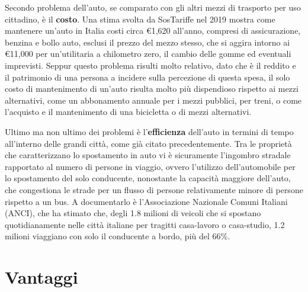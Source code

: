 Secondo problema dell'auto, se comparato con gli altri mezzi di trasporto per uso cittadino, è il \textbf{costo}. Una stima svolta da SosTariffe nel 2019 mostra come mantenere un'auto in Italia costi circa €1,620 all'anno, compresi di assicurazione, benzina e bollo auto, esclusi il prezzo del mezzo stesso, che si aggira intorno ai €11,000 per un'utilitaria a chilometro zero, il cambio delle gomme ed eventuali imprevisti\cite{sostariffe}. Seppur questo problema risulti molto relativo, dato che è il reddito e il patrimonio di una persona a incidere sulla percezione di questa spesa, il solo costo di mantenimento di un'auto risulta molto più dispendioso rispetto ai mezzi alternativi, come un abbonamento annuale per i mezzi pubblici, per treni, o come l'acquisto e il mantenimento di una bicicletta o di mezzi alternativi.

Ultimo ma non ultimo dei problemi è l'\textbf{efficienza} dell'auto in termini di tempo all'interno delle grandi città, come già citato precedentemente. Tra le proprietà che caratterizzano lo spostamento in auto vi è sicuramente l'ingombro stradale rapportato al numero di persone in viaggio, ovvero l'utilizzo dell'automobile per lo spostamento del solo conducente, nonostante la capacità maggiore dell'auto, che congestiona le strade per un flusso di persone relativamente minore di persone rispetto a un bus. A documentarlo è l'Associazione Nazionale Comuni Italiani (ANCI), che ha stimato che, degli 1.8 milioni di veicoli che si spostano quotidianamente nelle città italiane per tragitti casa-lavoro o casa-studio, 1.2 milioni viaggiano con solo il conducente a bordo\cite{anciperrepubblica}, più del 66\%.

\section{Vantaggi}

